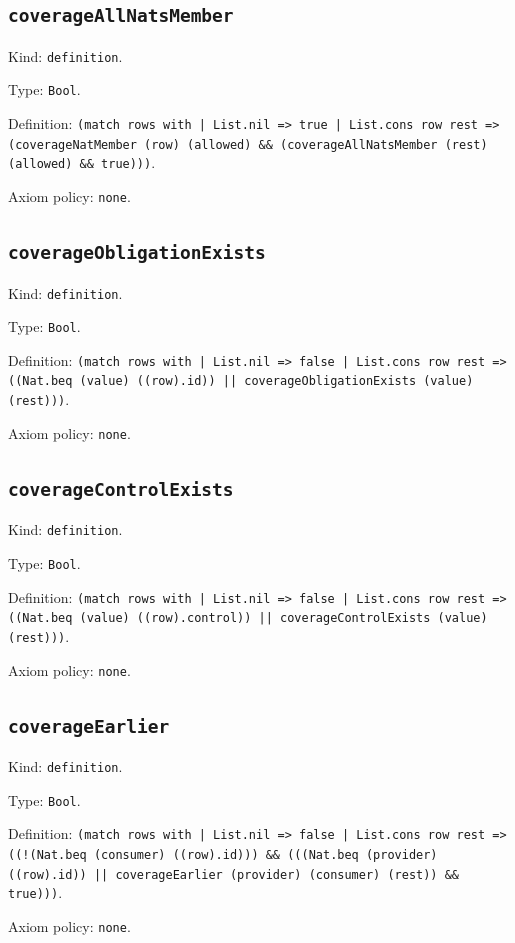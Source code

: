 \documentclass[11pt]{article}
\begin{document}
\subsection*{\texttt{coverageAllNatsMember}}
\noindent Kind: \texttt{definition}.\par
\noindent Type: \texttt{Bool}.\par
\noindent Definition: \texttt{(match rows with | List.nil => true | List.cons row rest => (coverageNatMember (row) (allowed) \&\& (coverageAllNatsMember (rest) (allowed) \&\& true)))}.\par
\noindent Axiom policy: \texttt{none}.\par
\subsection*{\texttt{coverageObligationExists}}
\noindent Kind: \texttt{definition}.\par
\noindent Type: \texttt{Bool}.\par
\noindent Definition: \texttt{(match rows with | List.nil => false | List.cons row rest => ((Nat.beq (value) ((row).id)) || coverageObligationExists (value) (rest)))}.\par
\noindent Axiom policy: \texttt{none}.\par
\subsection*{\texttt{coverageControlExists}}
\noindent Kind: \texttt{definition}.\par
\noindent Type: \texttt{Bool}.\par
\noindent Definition: \texttt{(match rows with | List.nil => false | List.cons row rest => ((Nat.beq (value) ((row).control)) || coverageControlExists (value) (rest)))}.\par
\noindent Axiom policy: \texttt{none}.\par
\subsection*{\texttt{coverageEarlier}}
\noindent Kind: \texttt{definition}.\par
\noindent Type: \texttt{Bool}.\par
\noindent Definition: \texttt{(match rows with | List.nil => false | List.cons row rest => ((!(Nat.beq (consumer) ((row).id))) \&\& (((Nat.beq (provider) ((row).id)) || coverageEarlier (provider) (consumer) (rest)) \&\& true)))}.\par
\noindent Axiom policy: \texttt{none}.\par
\end{document}
